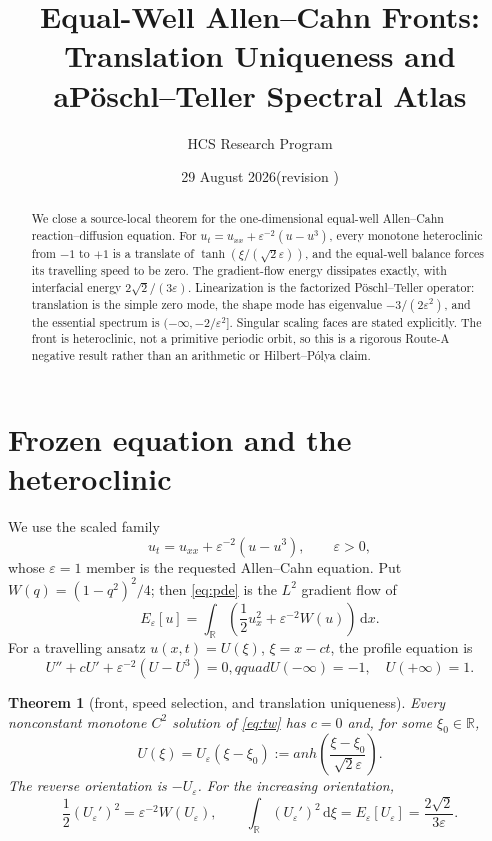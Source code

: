 \documentclass[10pt]{article}
\title{Equal-Well Allen--Cahn Fronts: Translation Uniqueness and a\newline Pöschl--Teller Spectral Atlas}
\author{HCS Research Program}
\date{29 August 2026\quad (revision \CRevisionRound)}
\newtheorem{theorem}{Theorem}
\newcommand{\dd}{\,\mathrm d}
\newcommand{\eps}{\varepsilon}
\begin{document}
\maketitle
\begin{abstract}
We close a source-local theorem for the one-dimensional equal-well
Allen--Cahn reaction--diffusion equation.  For
$u_t=u_{xx}+\eps^{-2}(u-u^3)$, every monotone heteroclinic from $-1$ to $+1$
is a translate of $\tanh(\xi/(\sqrt2\eps))$, and the equal-well balance
forces its travelling speed to be zero.  The gradient-flow energy dissipates
exactly, with interfacial energy $2\sqrt2/(3\eps)$.  Linearization is the
factorized Pöschl--Teller operator: translation is the simple zero mode, the
shape mode has eigenvalue $-3/(2\eps^2)$, and the essential spectrum is
$(-\infty,-2/\eps^2]$.  Singular scaling faces are stated explicitly.  The
front is heteroclinic, not a primitive periodic orbit, so this is a rigorous
Route-A negative result rather than an arithmetic or Hilbert--Pólya claim.
\end{abstract}

\section{Frozen equation and the heteroclinic}
We use the scaled family
\begin{equation}
 u_t=u_{xx}+\eps^{-2}(u-u^3),\qquad \eps>0,
 \label{eq:pde}
\end{equation}
whose $\eps=1$ member is the requested Allen--Cahn equation.  Put
$W(q)=(1-q^2)^2/4$; then \eqref{eq:pde} is the $L^2$ gradient flow of
\begin{equation}
 E_\eps[u]=\int_{\mathbb R}\left(\frac12u_x^2+\eps^{-2}W(u)\right)\dd x.
 \label{eq:energy}
\end{equation}
For a travelling ansatz $u(x,t)=U(\xi)$, $\xi=x-ct$, the profile equation is
\begin{equation}
 U''+cU'+\eps^{-2}(U-U^3)=0,qquad
 U(-\infty)=-1,\quad U(+\infty)=1.
 \label{eq:tw}
\end{equation}

\begin{theorem}[front, speed selection, and translation uniqueness]\label{thm:front}
Every nonconstant monotone $C^2$ solution of \eqref{eq:tw} has $c=0$ and,
for some $\xi_0\in\mathbb R$,
\begin{equation}
 U(\xi)=U_\eps(\xi-\xi_0):=	anh\!\left(\frac{\xi-\xi_0}{\sqrt2\eps}\right).
 \label{eq:tanh}
\end{equation}
The reverse orientation is $-U_\eps$.  For the increasing orientation,
\begin{equation}
 \frac12(U_\eps')^2=\eps^{-2}W(U_\eps),\qquad
 \int_{\mathbb R}(U_\eps')^2\dd\xi
 =E_\eps[U_\eps]=\frac{2\sqrt2}{3\eps}.
 \label{eq:equip}
\end{equation}
\end{theorem}
\end{document}
